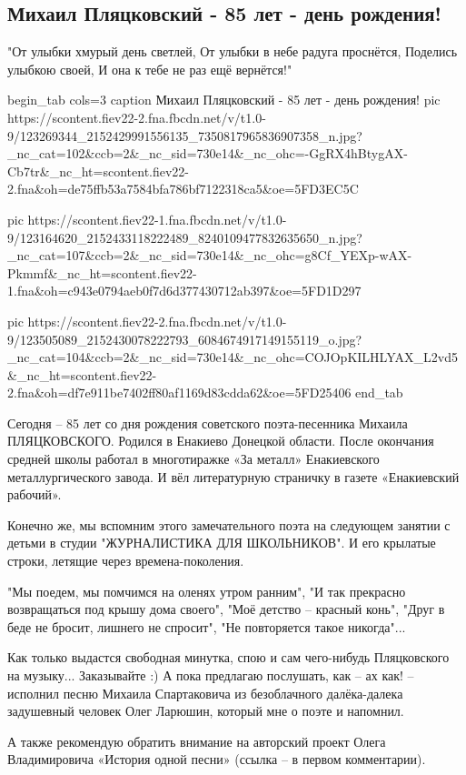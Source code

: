  
 
 

\subsection{Михаил Пляцковский - 85 лет - день рождения!}
\label{sec:02_11_2020.fb.roman_barashev.1.dr_mihail_pljackovskii_85}

\obeycr
"От улыбки хмурый день светлей,
От улыбки в небе радуга проснётся,
Поделись улыбкою своей,
И она к тебе не раз ещё вернётся!"
\restorecr

\ifcmt
begin_tab cols=3
	caption Михаил Пляцковский - 85 лет - день рождения!
pic https://scontent.fiev22-2.fna.fbcdn.net/v/t1.0-9/123269344_2152429991556135_7350817965836907358_n.jpg?_nc_cat=102&ccb=2&_nc_sid=730e14&_nc_ohc=-GgRX4hBtygAX-Cb7tr&_nc_ht=scontent.fiev22-2.fna&oh=de75ffb53a7584bfa786bf7122318ca5&oe=5FD3EC5C

pic https://scontent.fiev22-1.fna.fbcdn.net/v/t1.0-9/123164620_2152433118222489_8240109477832635650_n.jpg?_nc_cat=107&ccb=2&_nc_sid=730e14&_nc_ohc=g8Cf_YEXp-wAX-Pkmmf&_nc_ht=scontent.fiev22-1.fna&oh=c943e0794aeb0f7d6d377430712ab397&oe=5FD1D297

pic https://scontent.fiev22-2.fna.fbcdn.net/v/t1.0-9/123505089_2152430078222793_6084674917149155119_o.jpg?_nc_cat=104&ccb=2&_nc_sid=730e14&_nc_ohc=COJOpKILHLYAX_L2vd5&_nc_ht=scontent.fiev22-2.fna&oh=df7e911be7402ff80af1169d83cdda62&oe=5FD25406
end_tab
\fi

Сегодня -- 85 лет со дня рождения советского поэта-песенника  Михаила
ПЛЯЦКОВСКОГО. Родился в Енакиево Донецкой области. После окончания средней
школы работал в многотиражке «За металл» Енакиевского металлургического завода.
И вёл литературную страничку в газете «Енакиевский рабочий».

Конечно же, мы вспомним этого замечательного поэта на следующем занятии с
детьми в студии "ЖУРНАЛИСТИКА ДЛЯ ШКОЛЬНИКОВ". И его крылатые строки, летящие
через времена-поколения.

"Мы поедем, мы помчимся на оленях утром ранним", "И так прекрасно возвращаться
под крышу дома своего", "Моё детство -- красный конь", "Друг в беде не бросит,
лишнего не спросит", "Не повторяется такое никогда"...

Как только выдастся свободная минутка, спою и сам чего-нибудь Пляцковского на
музыку... Заказывайте :) А пока предлагаю послушать, как -- ах как! -- исполнил
песню Михаила Спартаковича из безоблачного далёка-далека задушевный человек
Олег Ларюшин, который мне о поэте и напомнил. 

А также рекомендую обратить внимание на авторский проект Олега Владимировича
«История одной песни» (ссылка -- в первом комментарии).
